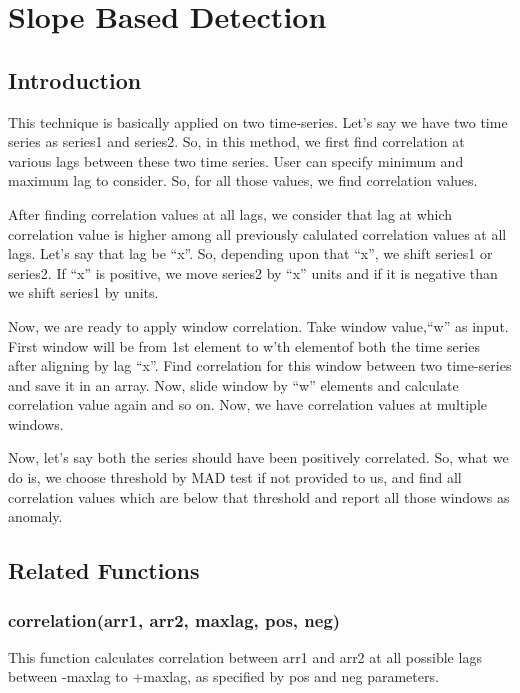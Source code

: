 \chapter{Slope Based Detection}

\section{Introduction}

This technique is basically applied on two time-series. Let's say we have two 
time series as series1 and series2. So, in this method, we first find 
correlation at various lags between these two time series. User can specify 
minimum and maximum lag to consider. So, for all those values, we find 
correlation values. 

After finding correlation values at all lags, we consider that lag at which 
correlation value is higher among all previously calulated correlation values 
at all lags. Let's say that lag be ``x''. So, depending upon that ``x'', we 
shift series1 or series2. If ``x'' is positive, we move series2 by ``x'' units 
and if it is negative than we shift series1 by  units.

Now, we are ready to apply window correlation. Take window value,``w'' as 
input. First window will be from 1st element to w'th elementof both the time 
series after aligning by lag ``x''. Find correlation for this window between 
two time-series and save it in an array. Now, slide window by ``w'' elements 
and 
calculate correlation value again and so on. Now, we have correlation values at 
multiple windows.

Now, let's say both the series should have been positively correlated. So, what 
we do is, we choose threshold by MAD test if not provided to us, and find all 
correlation values which are below that threshold and report all those windows 
as anomaly.

\section{Related Functions}

\subsection{correlation(arr1, arr2, maxlag, pos, neg)}

This function calculates correlation between arr1 and arr2 at all possible lags 
between -maxlag to +maxlag, as specified by pos and neg parameters.

